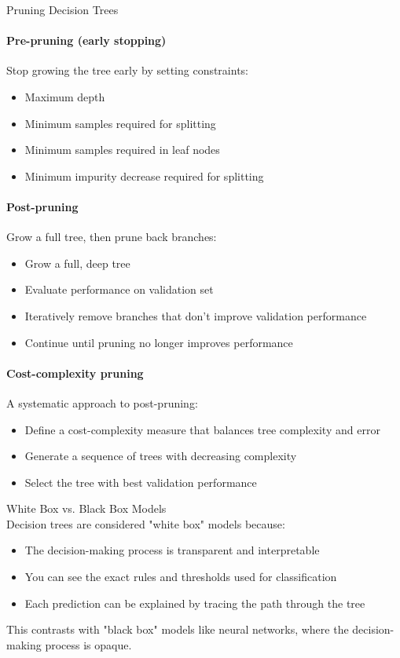 \begin{KR}{Pruning Decision Trees}\\
\paragraph{Pre-pruning (early stopping)}
Stop growing the tree early by setting constraints:
\begin{itemize}
    \item Maximum depth
    \item Minimum samples required for splitting
    \item Minimum samples required in leaf nodes
    \item Minimum impurity decrease required for splitting
\end{itemize}

\paragraph{Post-pruning}
Grow a full tree, then prune back branches:
\begin{itemize}
    \item Grow a full, deep tree
    \item Evaluate performance on validation set
    \item Iteratively remove branches that don't improve validation performance
    \item Continue until pruning no longer improves performance
\end{itemize}

\paragraph{Cost-complexity pruning}
A systematic approach to post-pruning:
\begin{itemize}
    \item Define a cost-complexity measure that balances tree complexity and error
    \item Generate a sequence of trees with decreasing complexity
    \item Select the tree with best validation performance
\end{itemize}
\end{KR}

\begin{concept}{White Box vs. Black Box Models}\\
Decision trees are considered "white box" models because:
\begin{itemize}
    \item The decision-making process is transparent and interpretable
    \item You can see the exact rules and thresholds used for classification
    \item Each prediction can be explained by tracing the path through the tree
\end{itemize}
This contrasts with "black box" models like neural networks, where the decision-making process is opaque.
\end{concept}

